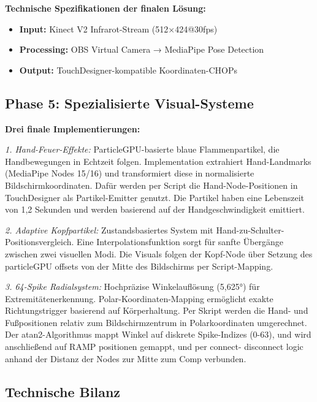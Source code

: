 \textbf{Technische Spezifikationen der finalen Lösung:}
\begin{itemize}
    \item \textbf{Input:} Kinect V2 Infrarot-Stream (512×424@30fps)
    \item \textbf{Processing:} OBS Virtual Camera → MediaPipe Pose Detection
    \item \textbf{Output:} TouchDesigner-kompatible Koordinaten-CHOPs
\end{itemize}

\subsection{Phase 5: Spezialisierte Visual-Systeme}

\textbf{Drei finale Implementierungen:}

\textit{1. Hand-Feuer-Effekte:}
ParticleGPU-basierte blaue Flammenpartikel, die Handbewegungen in Echtzeit folgen. Implementation extrahiert Hand-Landmarks (MediaPipe Nodes 15/16) und transformiert diese in normalisierte Bildschirmkoordinaten.
Dafür werden per Script die Hand-Node-Positionen in TouchDesigner als Partikel-Emitter genutzt. Die Partikel haben eine Lebenszeit von 1,2 Sekunden und werden basierend auf der Handgeschwindigkeit emittiert.


\textit{2. Adaptive Kopfpartikel:}
Zustandsbasiertes System mit Hand-zu-Schulter-Positionsvergleich. Eine Interpolationsfunktion sorgt für sanfte Übergänge zwischen zwei visuellen Modi.
Die Visuals folgen der Kopf-Node über Setzung des particleGPU offsets von der Mitte des Bildschirms per Script-Mapping.

\textit{3. 64-Spike Radialsystem:}
Hochpräzise Winkelauflösung (5,625°) für Extremitätenerkennung. Polar-Koordinaten-Mapping ermöglicht exakte Richtungstrigger basierend auf Körperhaltung.
Per Skript werden die Hand- und Fußpositionen relativ zum Bildschirmzentrum in Polarkoordinaten umgerechnet. Der atan2-Algorithmus mappt Winkel auf diskrete Spike-Indizes (0-63),
und wird anschließend auf RAMP positionen gemappt, und per connect- disconnect logic anhand der Distanz der Nodes zur Mitte zum Comp verbunden.

\newpage

\subsection{Technische Bilanz}

